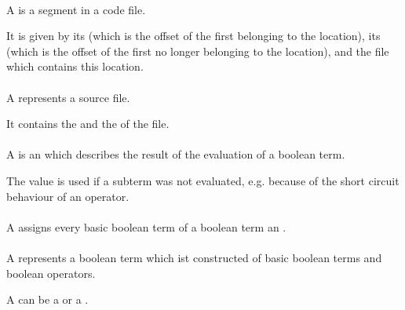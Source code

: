 \paragraph{}

A  is a segment in a code file.

It is given by its  (which is the offset of the
first  belonging to the location), its 
(which is the offset of the first  no longer belonging to the
location), and the file which contains this location.

\paragraph{}

A  represents a source file.

It contains the  and the  of the file.

\paragraph{}

A  is an  which describes the result of the
evaluation of a boolean term.

The value  is used if a subterm was not evaluated, e.g.
because of the short circuit behaviour of an operator.

\paragraph{}

A  assigns every basic boolean term of a boolean term
an .

\paragraph{}

A  represents a boolean term which ist constructed of basic
boolean terms and boolean operators.

A  can be a  or a .

\paragraph{}

